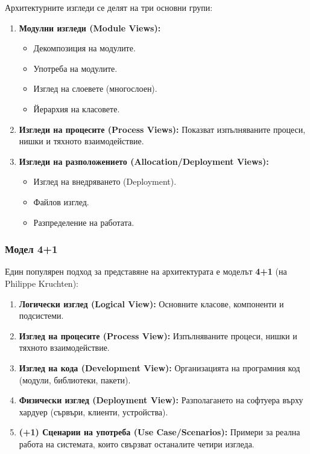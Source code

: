 \documentclass{scrartcl}
\begin{document}
\begin{FlushLeft}
Архитектурните изгледи се делят на три основни групи:
\begin{enumerate}
    \item \textbf{Модулни изгледи (Module Views):}
    \begin{itemize}
        \item Декомпозиция на модулите.
        \item Употреба на модулите.
        \item Изглед на слоевете (многослоен).
        \item Йерархия на класовете.
    \end{itemize}
    \item \textbf{Изгледи на процесите (Process Views):} Показват изпълняваните процеси, нишки и тяхното взаимодействие.
    \item \textbf{Изгледи на разположението (Allocation/Deployment Views):}
    \begin{itemize}
        \item Изглед на внедряването (Deployment).
        \item Файлов изглед.
        \item Разпределение на работата.
    \end{itemize}
\end{enumerate}

\subsubsection{Модел 4+1}

Един популярен подход за представяне на архитектурата е моделът \textbf{4+1} (на Philippe Kruchten):
\begin{enumerate}
    \item \textbf{Логически изглед (Logical View):} Основните класове, компоненти и подсистеми.
    \item \textbf{Изглед на процесите (Process View):} Изпълняваните процеси, нишки и тяхното взаимодействие.
    \item \textbf{Изглед на кода (Development View):} Организацията на програмния код (модули, библиотеки, пакети).
    \item \textbf{Физически изглед (Deployment View):} Разполагането на софтуера върху хардуер (сървъри, клиенти, устройства).
    \item \textbf{(+1) Сценарии на употреба (Use Case/Scenarios):} Примери за реална работа на системата, които свързват останалите четири изгледа.
\end{enumerate}


\end{FlushLeft}
\end{document}
